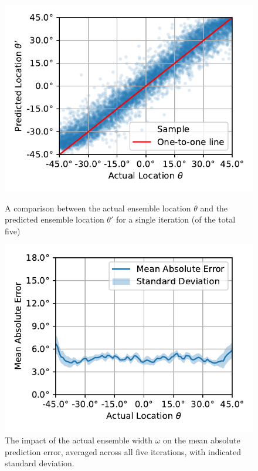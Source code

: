 \documentclass{article}
\begin{document}
\begin{figure}[ht]
  \centering
  \begin{minipage}[t]{0.45\linewidth}
    \includegraphics[width=\linewidth]{../figures/actual_vs_predicted_location.pdf}
    \caption{\label{fig:actual_vs_predicted_location}A comparison between the actual ensemble location $\theta$ and the predicted ensemble location $\theta'$ for a single iteration (of the total five) }
  \end{minipage}
  \hspace{0.5cm}
  \begin{minipage}[t]{0.45\linewidth}
    \includegraphics[width=\linewidth]{../figures/mae_location.pdf}
    \caption{\label{fig:mae_location}The impact of the actual ensemble width $\omega$ on the mean absolute prediction error, averaged across all five iterations, with indicated standard deviation.}
  \end{minipage}
\end{figure}
\end{document}
